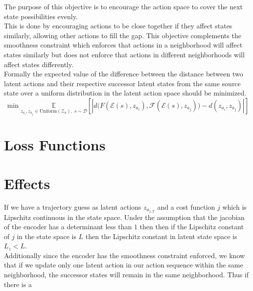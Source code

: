 \documentclass{article}
\begin{document}
The purpose of this objective is to encourage the action space to cover the next state possibilities evenly.\\

\noindent
This is done by encouraging actions to be close together if they affect states similarly, allowing other actions to fill the gap.
This objective complements the smoothness constraint which enforces that actions in a neighborhood will affect states similarly but does not enforce that actions in different neighborhoods will affect states differently.\\

\noindent
Formally the expected value of the difference between the distance between two latent actions and their respective successor latent states from the same source state over a uniform distribution in the latent action space should be minimized.
\[\min\limits\underset{z_{a_i}, z_{a_j} \in \text{Uniform}(\mathcal{Z}_a),\; s \sim \mathcal{D}}{\mathbb{E}}\left[|d\big(F(\mathcal{E}(s), z_{a_i}), \mathcal{F}(\mathcal{E}(s), z_{a_j})\big) - d(z_{a_i}, z_{a_j})|\right]\]

\section{Loss Functions}

\section{Effects}

If we have a trajectory guess as latent actions \(z_{a_{1:T}}\) and a cost function \(j\) which is Lipschitz continuous in the state space.
Under the assumption that the jacobian of the encoder has a determinant less than \(1\) then then if the Lipschitz constant of \(j\) in the state space is \(L\) then the Lipschitz constant in latent state space is \(L_z < L\).\\

\noindent
Additionally since the encoder has the smoothness constraint enforced, we know that if we update only one latent action in our action sequence within the same neighborhood, the successor states will remain in the same neighborhood.
Thus if there is a
\end{document}
